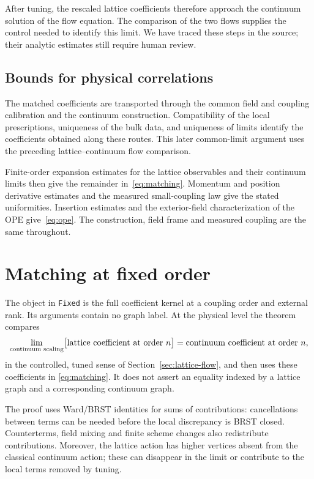 \documentclass[11pt]{article}
\newcommand{\code}[1]{{\small\nolinkurl{#1}}}
\begin{document}
After tuning, the rescaled lattice coefficients therefore approach the
continuum solution of the flow equation. The comparison of the two flows
supplies the control needed to identify this limit. We have traced these steps in
the source; their analytic estimates still require human review.

\subsection{Bounds for physical correlations}

The matched coefficients are transported through the common field and
coupling calibration and the continuum construction. Compatibility of the
local prescriptions, uniqueness of the bulk data, and uniqueness of limits
identify the coefficients obtained along these routes. This later
common-limit argument uses the preceding lattice--continuum flow comparison.

Finite-order expansion estimates for the lattice observables and their
continuum limits then give the remainder in~\eqref{eq:matching}. Momentum
and position derivative estimates and the measured small-coupling law give
the stated uniformities. Insertion estimates and the exterior-field
characterization of the OPE give~\eqref{eq:ope}. The construction, field
frame and measured coupling are the same throughout.

\section{Matching at fixed order}
\label{sec:graphs}

The object in \code{Fixed} is the full coefficient kernel at a coupling
order and external rank. Its arguments contain no graph label. At the
physical level the theorem compares
\[
 \lim_{\text{continuum scaling}}
 \bigl[\hbox{lattice coefficient at order }n\bigr]
 =\hbox{continuum coefficient at order }n,
\]
in the controlled, tuned sense of Section~\ref{sec:lattice-flow}, and then
uses these coefficients in \eqref{eq:matching}. It does not assert an
equality indexed by a lattice graph and a corresponding continuum graph.

The proof uses Ward/BRST identities for sums of contributions: cancellations
between terms can be needed before the local discrepancy is BRST closed.
Counterterms, field mixing and finite scheme changes also redistribute
contributions. Moreover, the lattice action has higher vertices absent
from the classical continuum action; these can disappear in the limit or
contribute to the local terms removed by tuning.
\end{document}
